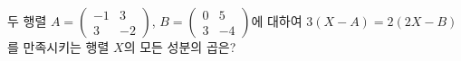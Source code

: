 두 행렬 $A=\begin{pmatrix} -1 & 3 \\ 3 & -2 \end{pmatrix}$, $B=\begin{pmatrix} 0 & 5 \\ 3 & -4 \end{pmatrix}$에 대하여 $3(X-A)=2(2X-B)$를 만족시키는 행렬 $X$의 모든 성분의 곱은?
